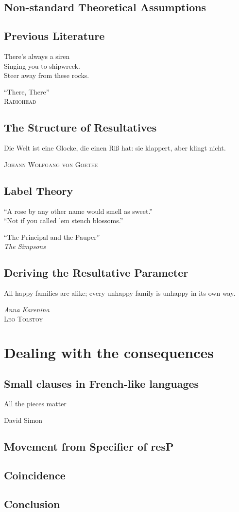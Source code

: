 \documentclass[
	12pt,
	twoside,
	narrowmargins
	]{ut-thesis}
\theoremstyle{definition}
\begin{document}
\chapter{Non-standard Theoretical Assumptions}\label{sec:nonstandard}

\chapter{Previous Literature}\label{sec:litreview}
\epigraph{
  There's always a siren\\
  Singing you to shipwreck.\\
  Steer away from these rocks.
}{``There, There''\\\textsc{Radiohead}}

\chapter{The Structure of Resultatives}\label{sec:analysis}
\epigraph{Die Welt ist eine Glocke, die einen Ri\ss{} hat: sie klappert, aber klingt nicht.}{\textsc{Johann Wolfgang von Goethe}}

\chapter{Label Theory}\label{sec:labels}
\epigraph{``A rose by any other name would smell as sweet.''\\
``Not if you called 'em stench blossoms.''}{``The Principal and the Pauper''\\\textit{The Simpsons}}

%
\chapter{Deriving the Resultative Parameter}\label{sec:deriving}
\epigraph{All happy families are alike; every unhappy family is unhappy in its own way.}{\textit{Anna Karenina}\\\textsc{Leo Tolstoy}}


\part{Dealing with the consequences}\label{sec:part2}
\chapter{Small clauses in French-like languages}\label{sec:FreSC}
\epigraph{All the pieces matter}{David Simon}

\chapter{Movement from Specifier of resP}\label{sec:ACCing}

\chapter{Coincidence}\label{sec:coincidence}

\chapter{Conclusion}\label{sec:Conclusion}

\printbibliography[heading=bibintoc]
\end{document}
